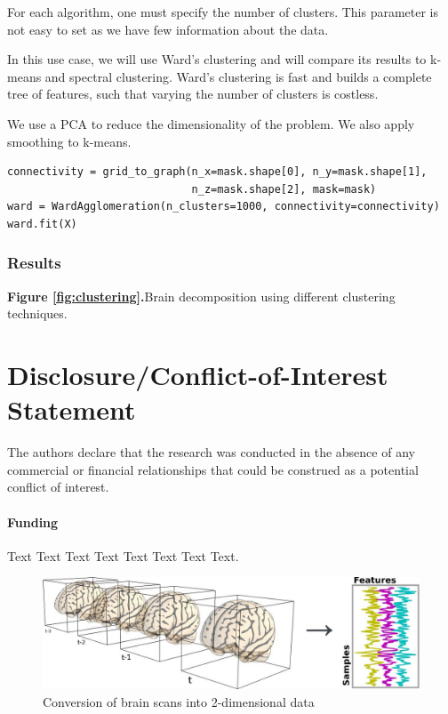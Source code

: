 \documentclass{frontiersSCNS} %
\begin{document}
For each algorithm, one must specify the number of clusters. This parameter is
not easy to set as we have few information about the data.

In this use case, we will use Ward's clustering and will compare its results to
k-means and spectral clustering. Ward's clustering is fast and builds a complete
tree of features, such that varying the number of clusters is costless.

We use a PCA to reduce the dimensionality of the problem. We also apply
smoothing to k-means.

\begin{lstlisting}
connectivity = grid_to_graph(n_x=mask.shape[0], n_y=mask.shape[1],
                             n_z=mask.shape[2], mask=mask)
ward = WardAgglomeration(n_clusters=1000, connectivity=connectivity)
ward.fit(X)
\end{lstlisting}

\subsubsection{Results}

\textbf{Figure \ref{fig:clustering}.}{Brain decomposition using different clustering techniques.}\label{fig:04}


\section*{Disclosure/Conflict-of-Interest Statement}
The authors declare that the research was conducted in the absence of any
commercial or financial relationships that could be construed as a potential
conflict of interest.

\paragraph{Funding\textcolon} Text Text Text Text Text Text  Text Text.



\newpage

\begin{figure}[h]
    \includegraphics[width=.5\linewidth]{img/niimgs.jpg}
    \caption{Conversion of brain scans into 2-dimensional data}
    \label{fig:niimg}
\end{figure}
\end{document}

